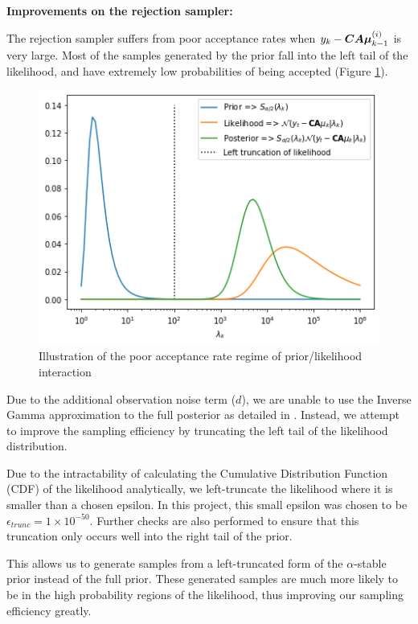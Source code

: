 \documentclass[../main.tex]{subfiles}
\begin{document}
\textbf{Improvements on the rejection sampler:}

The rejection sampler suffers from poor acceptance rates when $y_k - \bm{CA\mu}_{k-1}^{(i)}$ is very large. Most of the samples generated by the prior fall into the left tail of the likelihood, and have extremely low probabilities of being accepted (Figure \ref{fig:2__2__2__rejection_sampling_priors}). 

\begin{figure}[h!]
	\centering
	\includegraphics[width=12.0cm]{../plots/2__2__2__rejection_sampling_priors.png}
	\caption{Illustration of the poor acceptance rate regime of prior/likelihood interaction}
	\label{fig:2__2__2__rejection_sampling_priors}
\end{figure}

Due to the additional observation noise term ($d$), we are unable to use the Inverse Gamma approximation to the full posterior as detailed in \cite{godsill1999bayesian}. Instead, we attempt to improve the sampling efficiency by truncating the left tail of the likelihood distribution. 

Due to the intractability of calculating the Cumulative Distribution Function (CDF) of the likelihood analytically, we left-truncate the likelihood where it is smaller than a chosen epsilon. In this project, this small epsilon was chosen to be $\epsilon_{trunc} = 1 \times 10^{-50}$. Further checks are also performed to ensure that this truncation only occurs well into the right tail of the prior. 

This allows us to generate samples from a left-truncated form of the $\alpha$-stable prior instead of the full prior. These generated samples are much more likely to be in the high probability regions of the likelihood, thus improving our sampling efficiency greatly.
\end{document}
